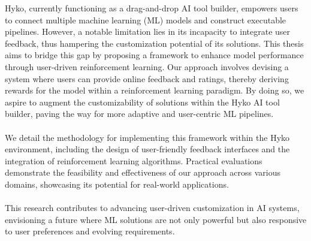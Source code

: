 Hyko, currently functioning as a drag-and-drop AI tool builder, empowers users to connect multiple machine learning (ML) models and construct executable pipelines. However, a notable limitation lies in its incapacity to integrate user feedback, thus hampering the customization potential of its solutions. This thesis aims to bridge this gap by proposing a framework to enhance model performance through user-driven reinforcement learning. Our approach involves devising a system where users can provide online feedback and ratings, thereby deriving rewards for the model within a reinforcement learning paradigm. By doing so, we aspire to augment the customizability of solutions within the Hyko AI tool builder, paving the way for more adaptive and user-centric ML pipelines.
\\
\\
We detail the methodology for implementing this framework within the Hyko environment, including the design of user-friendly feedback interfaces and the integration of reinforcement learning algorithms. Practical evaluations demonstrate the feasibility and effectiveness of our approach across various domains, showcasing its potential for real-world applications.
\\
\\
This research contributes to advancing user-driven customization in AI systems, envisioning a future where ML solutions are not only powerful but also responsive to user preferences and evolving requirements.